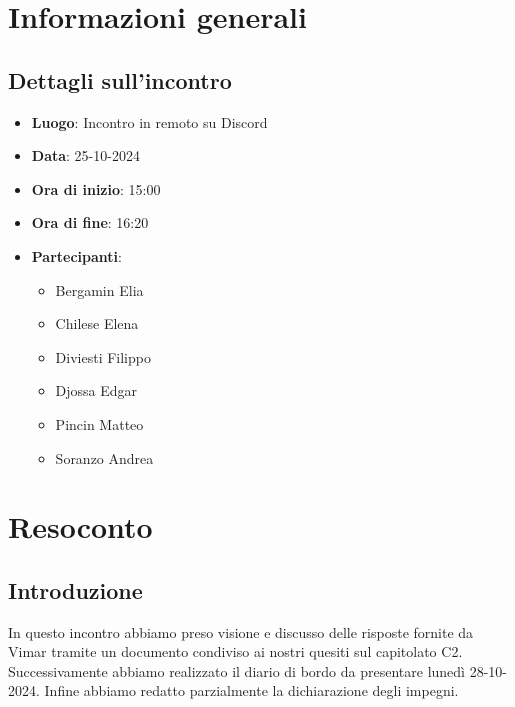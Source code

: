 \section{Informazioni generali}
\subsection{Dettagli sull'incontro}
\begin{itemize}
    \item \textbf{Luogo}: Incontro in remoto su Discord
    \item \textbf{Data}: 25-10-2024
    \item \textbf{Ora di inizio}: 15:00
    \item \textbf{Ora di fine}: 16:20
    \item \textbf{Partecipanti}:
    \begin{itemize}
        \item Bergamin Elia
        \item Chilese Elena
        \item Diviesti Filippo
        \item Djossa Edgar
        \item Pincin Matteo 
        \item Soranzo Andrea  
    \end{itemize}
\end{itemize}

\section{Resoconto}
    \subsection{Introduzione}
    In questo incontro abbiamo preso visione e discusso delle risposte fornite da Vimar tramite un documento condiviso ai nostri quesiti sul capitolato C2. Successivamente abbiamo realizzato il diario di bordo da presentare lunedì 28-10-2024. Infine abbiamo redatto parzialmente la dichiarazione degli impegni.
